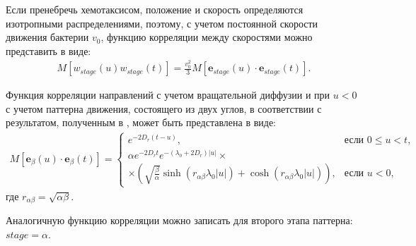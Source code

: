 Если пренебречь хемотаксисом, положение и скорость определяются изотропными распределениями, поэтому, с учетом постоянной скорости движения бактерии $v_0$, функцию корреляции между скоростями можно представить в виде:
\begin{equation}
    \begin{aligned}
        M\left [w_{stage}(u)w_{stage}(t) \right ]=\frac{v_0^2}{3} M \left [\textbf{e}_{stage}(u) \cdot \textbf{e}_{stage}(t) \right ].
    \label{eq:speed-correlation-function}
    \end{aligned}
\end{equation}

Функция корреляции направлений с учетом вращательной диффузии и при $u < 0$ с учетом паттерна движения, состоящего из двух углов, в соответствии с результатом, полученным в \cite{taktikos_how_2013}, может быть представлена в виде:
\begin{equation}
    \begin{aligned}
        M\left [\textbf{e}_{\beta}(u) \cdot \textbf{e}_{\beta}(t) \right ] = 
        \begin{cases}
            e^{-2D_r(t-u)}, & \text{если } 0 \leq u < t, \\
            \alpha e^{-2D_r t} e^{-(\lambda_0+2D_r)|u|} \times \\ 
            \times \left ( \sqrt{\frac{\beta}{\alpha}} \sinh\left (r_{\alpha\beta} \lambda_0 |u|\right ) + \cosh\left (r_{\alpha\beta} \lambda_0 |u|\right ) \right ), & \text{если } u < 0,
        \end{cases}        
    \label{eq:direction-correlation-function}
    \end{aligned}
\end{equation}
где $r_{\alpha \beta} = \sqrt{\alpha \beta}$.

Аналогичную функцию корреляции можно записать для второго этапа паттерна: $stage=\alpha$.

